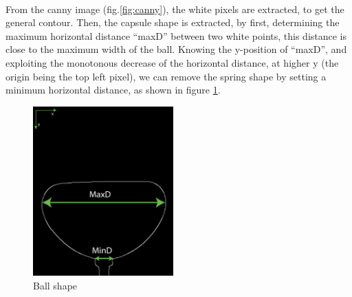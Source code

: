 \paragraph{}
From the canny image (fig.\ref{fig:canny}), the white pixels are extracted, to get the general contour. Then, the capsule shape is extracted, by first, determining the maximum horizontal distance "`maxD"' between two white points, this distance is close to the maximum width of the ball. Knowing the y-position of "`maxD"', and exploiting the monotonous decrease of the horizontal distance, at higher y (the origin being the top left pixel), we can remove the spring shape by setting a minimum horizontal distance, as shown in figure \ref{fig:ball_shape}.

\begin{figure}[H] %
	\centering%
  \includegraphics[width=0.48\textwidth]{figures/Chapter_1/ball_shape.png}
	\caption{Ball shape}
	\label{fig:ball_shape}
\end{figure}
